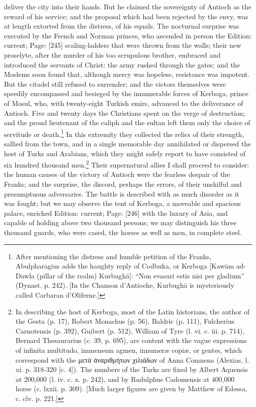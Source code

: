 deliver the city into their hands. But he claimed the sovereignty of Antioch as the reward of his service; and the proposal which had been rejected by the envy, was at length extorted from the distress, of his equals. The nocturnal surprise was executed by the French and Norman princes, who ascended in person the Edition: current; Page: [245] scaling-ladders that were thrown from the walls; their new proselyte, after the murder of his too scrupulous brother, embraced and introduced the servants of Christ: the army rushed through the gates; and the Moslems soon found that, although mercy was hopeless, resistance was impotent. But the citadel still refused to surrender; and the victors themselves were speedily encompassed and besieged by the innumerable forces of Kerboga, prince of Mosul, who, with twenty-eight Turkish emirs, advanced to the deliverance of Antioch. Five and twenty days the Christians spent on the verge of destruction; and the proud lieutenant of the caliph and the sultan left them only the choice of servitude or death.\footnote{After mentioning the distress and humble petition of the Franks, Abulpharagius adds the haughty reply of Codbuka, or Kerboga [Kawām ad-Dawla (pillar of the realm) Kurbughā]: \texthebrew{“}Non evasuri estis nisi per gladium\texthebrew{}” (Dynast. p. 242). [In the Chanson d\texthebrew{}’Antioche, Kurbughā is mysteriously called Carbaran d\texthebrew{}’Oliferne.]} In this extremity they collected the relics of their strength, sallied from the town, and in a single memorable day annihilated or dispersed the host of Turks and Arabians, which they might safely report to have consisted of six hundred thousand men.\footnote{In describing the host of Kerboga, most of the Latin historians, the author of the Gesta (p. 17), Robert Monachus (p. 56), Baldric (p. 111), Fulcherius Carnotensis (p. 392), Guibert (p. 512), William of Tyre (l. vi. c. iii. p. 714), Bernard Thesaurarius (c. 39, p. 695), are content with the vague expressions of infinita multitudo, immensum agmen, innumeræ copiæ, or gentes, which correspond with the \textgreek{μετ\texthebrew{ὰ ἀ}ναριθμήτων χιλιάδων} of Anna Comnena (Alexias, l. xi. p. 318-320 [c. 4]). The numbers of the Turks are fixed by Albert Aquensis at 200,000 (l. iv. c. x. p. 242), and by Radulphus Cadomensis at 400,000 horse (c. lxxii. p. 309). [Much larger figures are given by Matthew of Edessa, c. clv. p. 221.]} Their supernatural allies I shall proceed to consider: the human causes of the victory of Antioch were the fearless despair of the Franks; and the surprise, the discord, perhaps the errors, of their unskilful and presumptuous adversaries. The battle is described with as much disorder as it was fought; but we may observe the tent of Kerboga, a moveable and spacious palace, enriched Edition: current; Page: [246] with the luxury of Asia, and capable of holding above two thousand persons; we may distinguish his three thousand guards, who were cased, the horses as well as men, in complete steel.

